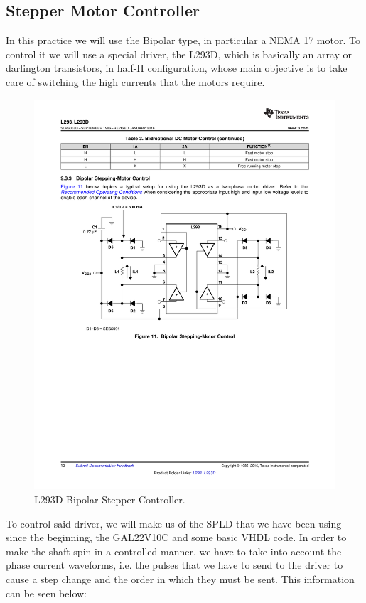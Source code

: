 \subsection{Stepper Motor Controller}

In this practice we will use the Bipolar type, in particular a NEMA 17 motor. To control it we will use a special driver, the L293D, which is basically an array or darlington transistors, in half-H configuration,  whose main objective is to take care of switching the high currents that the motors require. 

\vspace{0.3cm}

\begin{figure}[H]
    \centering
    \includegraphics[scale = 0.85]{Graphics/Practice 3/GRAPHICS/DATASHEETS/L293D_INTERNAL.pdf}
    \caption{L293D Bipolar Stepper Controller. ~\autocite{L293D}}
    \label{fig:L293D}
\end{figure}

To control said driver, we will make us of the SPLD that we have been using since the beginning, the GAL22V10C and some basic VHDL code. In order to make the shaft spin in a controlled manner, we have to take into account the phase current waveforms, i.e. the pulses that we have to send to the driver to cause a step change and the order in which they must be sent. This information can be seen below:

